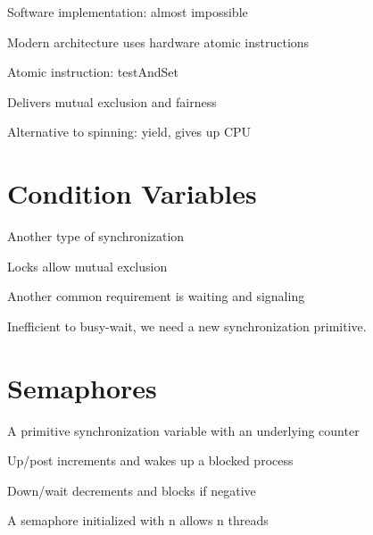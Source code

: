 \documentclass[12pt]{article}
\begin{document}
Software implementation: almost impossible

Modern architecture uses hardware atomic instructions

Atomic instruction: testAndSet

Delivers mutual exclusion and fairness

Alternative to spinning: yield, gives up CPU

\section{Condition Variables}

Another type of synchronization

Locks allow mutual exclusion

Another common requirement is waiting and signaling

Inefficient to busy-wait, we need a new synchronization primitive.

\section{Semaphores}

A primitive synchronization variable with an underlying counter

Up/post increments and wakes up a blocked process

Down/wait decrements and blocks if negative

A semaphore initialized with n allows n threads
\end{document}
